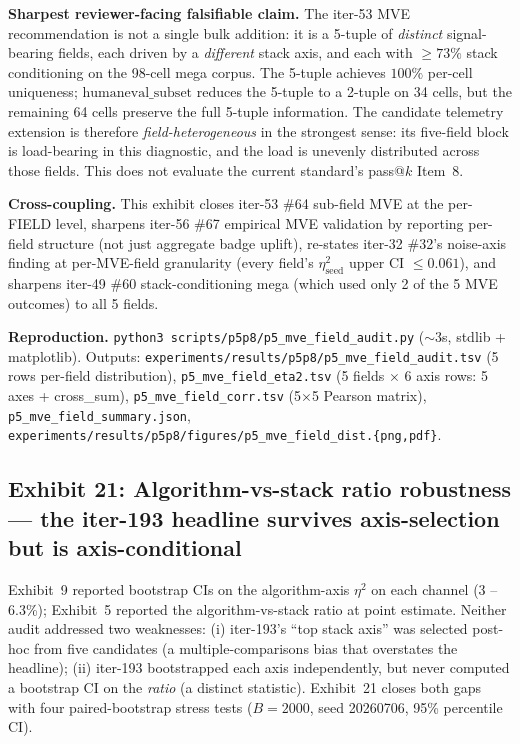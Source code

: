 \documentclass{article}  \usepackage[preprint,nonatbib]{neurips_2026} \usepackage[numbers]{natbib}
\begin{document}
\textbf{Sharpest reviewer-facing falsifiable claim.} The iter-53 MVE
recommendation is not a single bulk addition: it is a 5-tuple of
\emph{distinct} signal-bearing fields, each driven by a \emph{different}
stack axis, and each with $\geq 73\%$ stack conditioning on the 98-cell
mega corpus. The 5-tuple achieves $100\%$ per-cell uniqueness;
$\mathrm{humaneval\_subset}$ reduces the 5-tuple to a 2-tuple on 34
cells, but the remaining 64 cells preserve the full 5-tuple
information. The candidate telemetry extension is therefore
\emph{field-heterogeneous} in the strongest sense: its five-field block is
load-bearing in this diagnostic, and the load is unevenly distributed across
those fields. This does not evaluate the current standard's pass@$k$ Item~8.

\textbf{Cross-coupling.} This exhibit closes iter-53 \#64
sub-field MVE at the per-FIELD level, sharpens iter-56 \#67
empirical MVE validation by reporting per-field structure (not just
aggregate badge uplift), re-states iter-32 \#32's noise-axis
finding at per-MVE-field granularity (every field's
$\eta^2_{\mathrm{seed}}$ upper CI $\leq 0.061$), and sharpens
iter-49 \#60 stack-conditioning mega (which used only 2 of the 5
MVE outcomes) to all 5 fields.

\textbf{Reproduction.}
\texttt{python3 scripts/p5p8/p5\_mve\_field\_audit.py}
($\sim$3s, stdlib + matplotlib). Outputs:
\texttt{experiments/results/p5p8/p5\_mve\_field\_audit.tsv} (5 rows
per-field distribution),
\texttt{p5\_mve\_field\_eta2.tsv} (5 fields $\times$ 6 axis rows:
5 axes + cross\_sum),
\texttt{p5\_mve\_field\_corr.tsv} (5$\times$5 Pearson matrix),
\texttt{p5\_mve\_field\_summary.json},
\texttt{experiments/results/p5p8/figures/p5\_mve\_field\_dist.\{png,pdf\}}.

\subsection{Exhibit 21: Algorithm-vs-stack ratio robustness --- the iter-193 headline survives axis-selection but is axis-conditional}
\label{sec:p5-exhibit-ratio-robustness}

Exhibit~9 reported bootstrap CIs on the algorithm-axis $\eta^2$ on each
channel (3 -- 6.3\%); Exhibit~5 reported the algorithm-vs-stack ratio at
point estimate. Neither audit addressed two weaknesses: (i) iter-193's
``top stack axis'' was selected post-hoc from five candidates (a
multiple-comparisons bias that overstates the headline); (ii) iter-193
bootstrapped each axis independently, but never computed a bootstrap CI on
the \emph{ratio} (a distinct statistic). Exhibit~21 closes both gaps with
four paired-bootstrap stress tests ($B{=}2000$, seed 20260706, 95\%
percentile CI).
\end{document}
